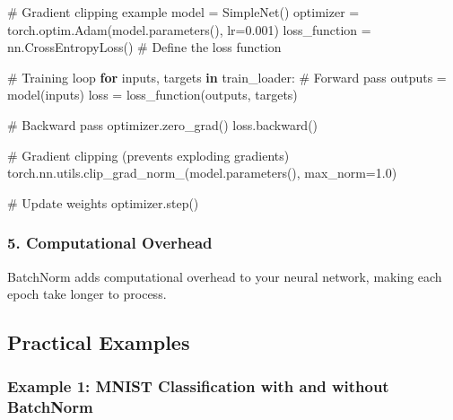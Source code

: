 \documentclass[
  letterpaper,
  DIV=11,
  numbers=noendperiod]{scrreprt}
\newenvironment{Shaded}{\begin{snugshade}}{\end{snugshade}}
\newcommand{\CommentTok}[1]{\textcolor[rgb]{0.37,0.37,0.37}{#1}}
\newcommand{\ControlFlowTok}[1]{\textcolor[rgb]{0.00,0.23,0.31}{\textbf{#1}}}
\newcommand{\FloatTok}[1]{\textcolor[rgb]{0.68,0.00,0.00}{#1}}
\newcommand{\KeywordTok}[1]{\textcolor[rgb]{0.00,0.23,0.31}{\textbf{#1}}}
\newcommand{\NormalTok}[1]{\textcolor[rgb]{0.00,0.23,0.31}{#1}}
\newcommand{\OperatorTok}[1]{\textcolor[rgb]{0.37,0.37,0.37}{#1}}
\begin{document}
\begin{Shaded}
\begin{Highlighting}[]
\CommentTok{\# Gradient clipping example}
\NormalTok{model }\OperatorTok{=}\NormalTok{ SimpleNet()}
\NormalTok{optimizer }\OperatorTok{=}\NormalTok{ torch.optim.Adam(model.parameters(), lr}\OperatorTok{=}\FloatTok{0.001}\NormalTok{)}
\NormalTok{loss\_function }\OperatorTok{=}\NormalTok{ nn.CrossEntropyLoss()  }\CommentTok{\# Define the loss function}

\CommentTok{\# Training loop}
\ControlFlowTok{for}\NormalTok{ inputs, targets }\KeywordTok{in}\NormalTok{ train\_loader:}
    \CommentTok{\# Forward pass}
\NormalTok{    outputs }\OperatorTok{=}\NormalTok{ model(inputs)}
\NormalTok{    loss }\OperatorTok{=}\NormalTok{ loss\_function(outputs, targets)}
    
    \CommentTok{\# Backward pass}
\NormalTok{    optimizer.zero\_grad()}
\NormalTok{    loss.backward()}
    
    \CommentTok{\# Gradient clipping (prevents exploding gradients)}
\NormalTok{    torch.nn.utils.clip\_grad\_norm\_(model.parameters(), max\_norm}\OperatorTok{=}\FloatTok{1.0}\NormalTok{)}
    
    \CommentTok{\# Update weights}
\NormalTok{    optimizer.step()}
\end{Highlighting}
\end{Shaded}

\subsubsection{5. Computational Overhead}\label{computational-overhead}

BatchNorm adds computational overhead to your neural network, making
each epoch take longer to process.

\subsection{Practical Examples}\label{practical-examples}

\subsubsection{Example 1: MNIST Classification with and without
BatchNorm}\label{example-1-mnist-classification-with-and-without-batchnorm}
\end{document}
